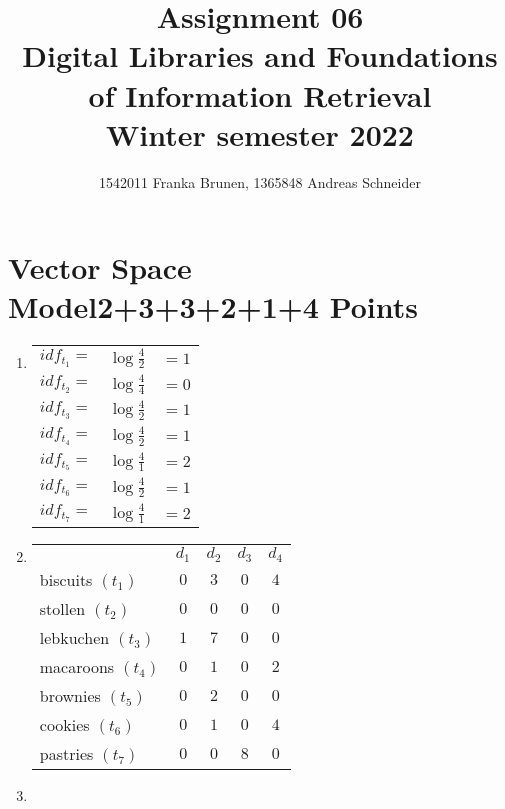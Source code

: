 \documentclass[10pt,a4paper]{article}
\title{ \vspace{-3em}
        Assignment 06\\
		\small{\bf Digital Libraries and Foundations of Information Retrieval}\\
		\small{Winter semester 2022}}
\author{\small{1542011 Franka Brunen}, \small{1365848 Andreas Schneider}}
\date{}
\begin{document}
\setlength{\parskip}{6pt} %
\setlength{\parindent}{0pt}

\leftskip=1cm\rightskip=0.5cm %

\maketitle

\section{\hfill Vector Space Model\hfill 2+3+3+2+1+4 Points}
\begin{enumerate}
    \item \begin{tabular}[t]{ccc}
             $idf_{t_1} = $&$\log\frac{4}{2}$ & $=1$  \\
             $idf_{t_2} = $&$\log\frac{4}{4}$ & $=0$  \\
             $idf_{t_3} = $&$\log\frac{4}{2}$ & $=1$  \\
             $idf_{t_4} = $&$\log\frac{4}{2}$ & $=1$  \\
             $idf_{t_5} = $&$\log\frac{4}{1}$ & $=2$  \\
             $idf_{t_6} = $&$\log\frac{4}{2}$ & $=1$  \\
             $idf_{t_7} = $&$\log\frac{4}{1}$ & $=2$
        \end{tabular}
    \item \begin{tabular}[t]{lcccc}
             & $d_1$&$d_2$&$d_3$&$d_4$ \\
            biscuits $(t_1)$    & $0$&$3$&$0$&$4$ \\
            stollen $(t_2)$    & $0$&$0$&$0$&$0$ \\
            lebkuchen $(t_3)$    & $1$&$7$&$0$&$0$ \\
            macaroons $(t_4)$    & $0$&$1$&$0$&$2$ \\
            brownies $(t_5)$    & $0$&$2$&$0$&$0$ \\
            cookies $(t_6)$    & $0$&$1$&$0$&$4$ \\
            pastries $(t_7)$    & $0$&$0$&$8$&$0$ \\
        \end{tabular}
    \item \begin{tabular}[t]{lcccc}

\end{tabular}
\end{enumerate}
\end{document}
